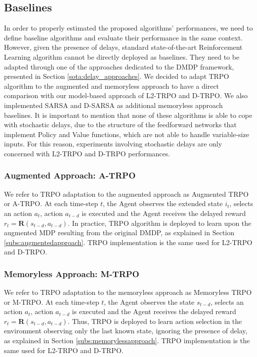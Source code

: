                 
        \subsection{Baselines}
        \label{sub:baselines}
            In order to properly estimated the proposed algorithms' performances, we need to define baseline algorithms and evaluate their performance in the same context. However, given the presence of delays, standard state-of-the-art Reinforcement Learning algorithm cannot be directly deployed as baselines. They need to be adapted through one of the approaches dedicated to the DMDP framework, presented in Section \ref{sota:delay_approaches}. We decided to adapt TRPO algorithm to the augmented and memoryless approach to have a direct comparison with our model-based approach of L2-TRPO and D-TRPO. We also implemented SARSA and D-SARSA as additional memoryless approach baselines. \newline
            It is important to mention that none of these algorithms is able to cope with stochastic delays, due to the structure of the feedforward networks that implement Policy and Value functions, which are not able to handle variable-size inputs. For this reason, experiments involving stochastic delays are only concerned with L2-TRPO and D-TRPO performances.
            
            \subsubsection{Augmented Approach: A-TRPO}
                We refer to TRPO adaptation to the augmented approach as Augmented TRPO or A-TRPO. At each time-step $t$, the Agent observes the extended state $i_t$, selects an action $a_t$, action $a_{t-d}$ is executed and the Agent receives the delayed reward $r_t = \mathbf{R}(s_{t-d}, a_{t-d})$. In practice, TRPO algorithm is deployed to learn upon the augmented MDP resulting from the original DMDP, as explained in Section \ref{subs:augmentedapproach}. TRPO implementation is the same used for L2-TRPO and D-TRPO.
                
            \subsubsection{Memoryless Approach: M-TRPO}
                We refer to TRPO adaptation to the memoryless approach as Memoryless TRPO or M-TRPO. At each time-step $t$, the Agent observes the state $s_{t-d}$, selects an action $a_t$, action $a_{t-d}$ is executed and the Agent receives the delayed reward $r_t = \mathbf{R}(s_{t-d}, a_{t-d})$. Thus, TRPO is deployed to learn action selection in the environment observing only the last known state, ignoring the presence of delay, as explained in Section \ref{subs:memorylessapproach}. TRPO implementation is the same used for L2-TRPO and D-TRPO.
                
